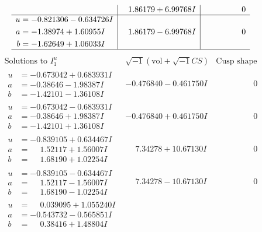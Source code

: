 \documentclass[1p]{elsarticle_modified}
\theoremstyle{definition}
\newcommand{\I}{\sqrt{-1}}
\begin{document}
$$\begin{array}{c|c|c}
 & \phantom{-}1.86179 + 6.99768 I & \phantom{-0.000000 } 0 \\ \hline\begin{aligned}
u &= -0.821306 - 0.634726 I \\
a &= -1.38974 + 1.60955 I \\
b &= -1.62649 + 1.06033 I\end{aligned}
 & \phantom{-}1.86179 - 6.99768 I & \phantom{-0.000000 } 0\\
 \hline 
 \end{array}$$\newpage$$\begin{array}{c|c|c}  
\text{Solutions to }I^u_{1}& \I (\text{vol} + \sqrt{-1}CS) & \text{Cusp shape}\\
 \hline 
\begin{aligned}
u &= -0.673042 + 0.683931 I \\
a &= -0.38646 - 1.98387 I \\
b &= -1.42101 - 1.36108 I\end{aligned}
 & -0.476840 - 0.461750 I & \phantom{-0.000000 } 0 \\ \hline\begin{aligned}
u &= -0.673042 - 0.683931 I \\
a &= -0.38646 + 1.98387 I \\
b &= -1.42101 + 1.36108 I\end{aligned}
 & -0.476840 + 0.461750 I & \phantom{-0.000000 } 0 \\ \hline\begin{aligned}
u &= -0.839105 + 0.634467 I \\
a &= \phantom{-}1.52117 + 1.56007 I \\
b &= \phantom{-}1.68190 + 1.02254 I\end{aligned}
 & \phantom{-}7.34278 + 10.67130 I & \phantom{-0.000000 } 0 \\ \hline\begin{aligned}
u &= -0.839105 - 0.634467 I \\
a &= \phantom{-}1.52117 - 1.56007 I \\
b &= \phantom{-}1.68190 - 1.02254 I\end{aligned}
 & \phantom{-}7.34278 - 10.67130 I & \phantom{-0.000000 } 0 \\ \hline\begin{aligned}
u &= \phantom{-}0.039095 + 1.055240 I \\
a &= -0.543732 - 0.565851 I \\
b &= \phantom{-}0.38416 + 1.48804 I\end{aligned}

\end{array}$$
\end{document}
